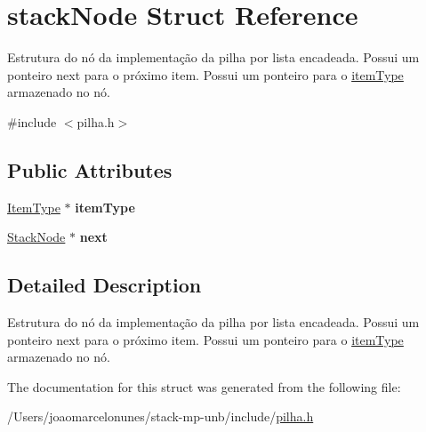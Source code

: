 \hypertarget{structstack_node}{}\section{stack\+Node Struct Reference}
\label{structstack_node}


Estrutura do nó da implementação da pilha por lista encadeada. Possui um ponteiro next para o próximo item. Possui um ponteiro para o \mbox{\hyperlink{structitem_type}{item\+Type}} armazenado no nó.  




{\ttfamily \#include $<$pilha.\+h$>$}

\subsection*{Public Attributes}
\begin{DoxyCompactItemize}
\item 
\mbox{\label{structstack_node_a3b61dc13341d86ba1acf26ae9e82a6aa}} 
\mbox{\hyperlink{pilha_8h_ae525c0f6c68dcd67700d0895c747ada4}{Item\+Type}} $\ast$ {\bfseries item\+Type}
\item 
\mbox{\label{structstack_node_a2a20aca631bb7cf6aab8a6e8b1f8c53a}} 
\mbox{\hyperlink{pilha_8h_aa2b918390d6428b82c080bb2b136e639}{Stack\+Node}} $\ast$ {\bfseries next}
\end{DoxyCompactItemize}


\subsection{Detailed Description}
Estrutura do nó da implementação da pilha por lista encadeada. Possui um ponteiro next para o próximo item. Possui um ponteiro para o \mbox{\hyperlink{structitem_type}{item\+Type}} armazenado no nó. 



The documentation for this struct was generated from the following file\+:\begin{DoxyCompactItemize}
\item 
/\+Users/joaomarcelonunes/stack-\/mp-\/unb/include/\mbox{\hyperlink{pilha_8h}{pilha.\+h}}\end{DoxyCompactItemize}
